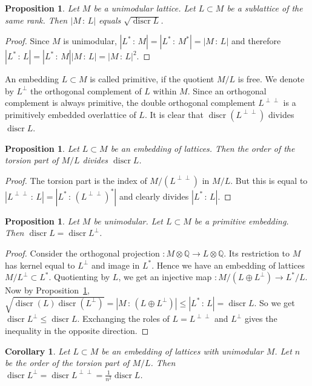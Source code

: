 \documentclass{amsart}
\DeclareMathOperator{\discr}{discr}
\newcommand{\DP}{\,{:}\,}
\newcommand{\Q}{\mathbb{Q}}
\theoremstyle{plain}
\newtheorem{proposition}[theorem]{Proposition}
\newtheorem{corollary}[theorem]{Corollary}
\theoremstyle{definition}
\theoremstyle{remark}
\begin{document}
\begin{proposition} \label{squareDiscr}Let $M$ be a unimodular lattice. Let $L\subset M$ be a sublattice of the same rank. Then $|M\DP L|$ equals $\sqrt{\discr L}$.
\end{proposition}
\begin{proof}
Since $M$ is unimodular, $|L^*\DP M|=|L^*\DP M^*| =|M\DP L| $ and therefore $|L^*\DP L| = |L^*\DP M||M\DP L|  = |M\DP L|^2$.
\end{proof}
An embedding $L\subset M$ is called primitive, if the quotient $M/L$ is free. We denote by $L^\perp$ the orthogonal complement of $L$ within $M$. Since an orthogonal complement is always primitive, the double orthogonal complement $ L^{\perp\perp}$ is a primitively embedded overlattice of $L$. It is clear that $\discr( L^{\perp\perp})$ divides $\discr L$. 
\begin{proposition}\label{TorsionQuotient} Let $L\subset M$ be an embedding of lattices. Then the order of the torsion part of $M/L$ 
divides $\discr L$.
\end{proposition}
\begin{proof}
The torsion part is the index of $M/( L^{\perp\perp})$ in $M/L$. But this is equal to $|L^{\perp\perp}\DP L| = |L^* \DP (L^{\perp\perp})^*|$ and clearly divides $|L^*\DP L|$.
\end{proof}
\begin{proposition}\label{discrOrthPrim}
Let $M$ be unimodular. Let $L\subset M$ be a primitive embedding. Then $\discr L = \discr L^\perp$.
\end{proposition}
\begin{proof}
Consider the orthogonal projection $ : M\otimes\Q \rightarrow L\otimes \Q$. Its restriction to $M$ has kernel equal to $L^\perp$ and image in $L^*$. Hence we have an embedding of lattices $M/L^\perp \subset L^*$. Quotienting by $L$, we get an injective map $: M/(L\oplus L^\perp) \rightarrow L^*/L$. 
Now by Proposition~\ref{squareDiscr}, $\sqrt{\discr(L) \discr (L^\perp)} =|M \DP (L\oplus L^\perp)| \leq |L^*\DP L| = \discr L$. So we get $\discr L^\perp \leq \discr L$. Exchanging the roles of $L=L^{\perp\perp}$ and $L^\perp$ gives the inequality in the opposite direction.
\end{proof}
\begin{corollary}\label{latticeCor}
Let $L\subset M$ be an embedding of lattices with unimodular $M$. Let $n$ be the order of the torsion part of $M/L$. Then $\discr L^\perp =\discr L^{\perp\perp} = \frac{1}{n^2}\discr L$.
\end{corollary}
\end{document}
